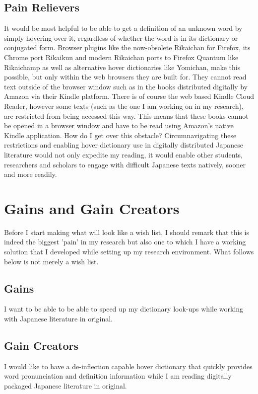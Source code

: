 \documentclass{article}
\begin{document}
\subsection{Pain Relievers}
It would be most helpful to be able to get a definition of an unknown word by simply hovering over it, regardless of whether the word is in its dictionary or conjugated form. Browser plugins like the now-obsolete Rikaichan for Firefox, its Chrome port Rikaikun and modern Rikaichan ports to Firefox Quantum like Rikaichamp as well as alternative hover dictionaries like Yomichan, make this possible, but only within the web browsers they are built for. They cannot read text outside of the browser window such as in the books distributed digitally by Amazon via their Kindle platform. There is of course the web based Kindle Cloud Reader, however some texts (such as the one I am working on in my research), are restricted from being accessed this way. This means that these books cannot be opened in a browser window and have to be read using Amazon's native Kindle application. How do I get over this obstacle? Circumnavigating these restrictions and enabling hover dictionary use in digitally distributed Japanese literature would not only expedite my reading, it would enable other students, researchers and scholars to engage with difficult Japanese texts natively, sooner and more readily.
\section{Gains and Gain Creators}
Before I start making what will look like a wish list, I should remark that this is indeed the biggest 'pain' in my research but also one to which I have a working solution that I developed while setting up my research environment. What follows below is not merely a wish list.
\subsection{Gains}
I want to be able to be able to speed up my dictionary look-ups while working with Japanese literature in original.
\subsection{Gain Creators}
I would like to have a de-inflection capable hover dictionary that quickly provides word pronunciation and definition information while I am reading digitally packaged Japanese literature in original.
\end{document}
